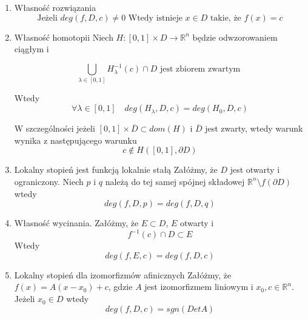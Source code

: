 \begin{enumerate}
 \item Własność rozwiązania \newline
   \begin{equation}
   \mbox{Jeżeli  }  deg(f,D,c) \neq 0  \mbox{ Wtedy istnieje } x \in D  \mbox{ takie, że }  f(x) = c 
   \end{equation}
   
  \item Własność homotopii  \newline
  Niech $ H : [0,1] \times D \to \mathbb R^n $ będzie odwzorowaniem ciągłym i 
  
  \begin{equation} \label{eq:homotopy}
    \bigcup_{\lambda \in [0,1] } H^{-1}_{\lambda }(c) \cap D \mbox{ jest zbiorem zwartym }
  \end{equation}

  Wtedy 
  \begin{equation}
      \forall \lambda \in [0,1] \quad deg(H_{\lambda},D,c) = deg(H_0,D,c) 
  \end{equation}
  
  W szczególności jeżeli $ [0,1] \times \overline{D} \subset dom(H) $ i $ \overline{D} $ jest zwarty, wtedy warunk wynika z następującego warunku
  \begin{equation}
    c \notin H([0,1], \partial{D})
  \end{equation}
  
  \item Lokalny stopień jest funkcją lokalnie stałą \newline
    Załóżmy, że $ D $ jest otwarty i ograniczony. Niech $p $ i $ q $ należą do tej samej spójnej składowej $ \mathbb R^n  \setminus f(\partial{D}) $  wtedy
    \begin{equation} \label{eq:locallity}
      deg(f,D,p) = deg(f,D,q)
    \end{equation}
  
  \item Własność wycinania. \newline
    Załóżmy, że $ E \subset D $, $ E $ otwarty i 
    \begin{equation}
	f^{-1}(c) \cap D \subset E 
    \end{equation}
    Wtedy
    \begin{equation}
        deg(f,E,c) = deg(f,D,c)
    \end{equation}
    
    \item Lokalny stopień dla izomorfizmów afinicznych \newline
    Załóżmy, że $ f(x) = A(x-x_0) + c $, gdzie $ A $ jest izomorfizmem liniowym i $ x_0,c \in \mathbb R^n $. 
    Jeżeli $ x_0 \in D$ wtedy
    \begin{equation}
        deg(f,D,c) = sgn(Det A)
    \end{equation}
    

\end{enumerate}
